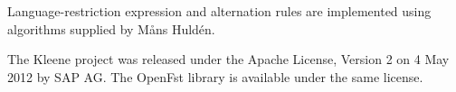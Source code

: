 \documentclass[letterpaper,12pt]{book}
\providecommand{\init}{}\renewcommand{\init}{\MakeUppercase}
\begin{document}
Language-restriction expression and alternation rules are implemented using
algorithms supplied by M\r{a}ns Huld\'en.

The Kleene project was released under the Apache License, Version
2 on 4 May 2012 by
\init{SAP AG}.  The OpenFst library is available
under the same license.

\nocite{hulden:2009thesis}
\nocite{allauzen+riley+schalkwyk+skut+mohri:2007}


\tableofcontents
% 


\mainmatter



\appendix




\backmatter

%



\end{document}
